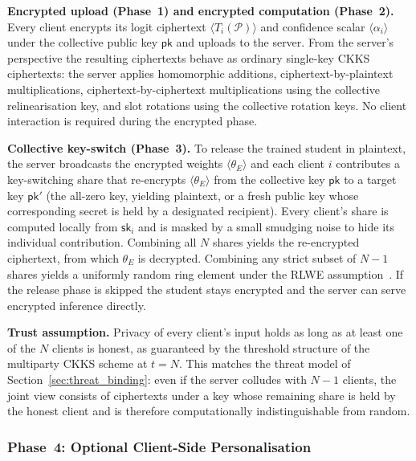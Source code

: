 \par\noindent\textbf{Encrypted upload (Phase~1) and encrypted computation (Phase~2).} Every client encrypts its logit ciphertext $\langle T_i(\mathcal P)\rangle$ and confidence scalar $\langle\alpha_i\rangle$ under the collective public key $\mathsf{pk}$ and uploads to the server. From the server's perspective the resulting ciphertexts behave as ordinary single-key CKKS ciphertexts: the server applies homomorphic additions, ciphertext-by-plaintext multiplications, ciphertext-by-ciphertext multiplications using the collective relinearisation key, and slot rotations using the collective rotation keys. No client interaction is required during the encrypted phase.

\par\noindent\textbf{Collective key-switch (Phase~3).} To release the trained student in plaintext, the server broadcasts the encrypted weights $\langle\theta_E\rangle$ and each client $i$ contributes a key-switching share that re-encrypts $\langle\theta_E\rangle$ from the collective key $\mathsf{pk}$ to a target key $\mathsf{pk}'$ (the all-zero key, yielding plaintext, or a fresh public key whose corresponding secret is held by a designated recipient). Every client's share is computed locally from $\mathsf{sk}_i$ and is masked by a small smudging noise to hide its individual contribution. Combining all $N$ shares yields the re-encrypted ciphertext, from which $\theta_E$ is decrypted. Combining any strict subset of $N{-}1$ shares yields a uniformly random ring element under the RLWE assumption~\cite{lyubashevsky2010ideal}. If the release phase is skipped the student stays encrypted and the server can serve encrypted inference directly.

\par\noindent\textbf{Trust assumption.} Privacy of every client's input holds as long as at least one of the $N$ clients is honest, as guaranteed by the threshold structure of the multiparty CKKS scheme at $t{=}N$. This matches the threat model of Section~\ref{sec:threat_binding}: even if the server colludes with $N{-}1$ clients, the joint view consists of ciphertexts under a key whose remaining share is held by the honest client and is therefore computationally indistinguishable from random.


\subsubsection{Phase~4: Optional Client-Side Personalisation}
\label{sec:phase4}

